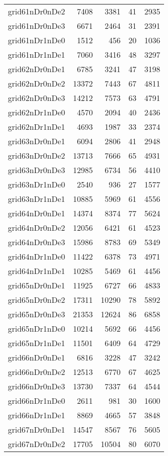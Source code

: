 \documentclass[../../../thesis.tex]{subfiles}
\begin{document}
\begin{longtable}{lrrrr}
grid61nDr0nDe2 & 7408 & 3381 & 41 & 2935 \\
grid61nDr0nDe3 & 6671 & 2464 & 31 & 2391 \\
grid61nDr1nDe0 & 1512 & 456 & 20 & 1036 \\
grid61nDr1nDe1 & 7060 & 3416 & 48 & 3297 \\
grid62nDr0nDe1 & 6785 & 3241 & 47 & 3198 \\
grid62nDr0nDe2 & 13372 & 7443 & 67 & 4811 \\
grid62nDr0nDe3 & 14212 & 7573 & 63 & 4791 \\
grid62nDr1nDe0 & 4570 & 2094 & 40 & 2436 \\
grid62nDr1nDe1 & 4693 & 1987 & 33 & 2374 \\
grid63nDr0nDe1 & 6094 & 2806 & 41 & 2948 \\
grid63nDr0nDe2 & 13713 & 7666 & 65 & 4931 \\
grid63nDr0nDe3 & 12985 & 6734 & 56 & 4410 \\
grid63nDr1nDe0 & 2540 & 936 & 27 & 1577 \\
grid63nDr1nDe1 & 10885 & 5969 & 61 & 4556 \\
grid64nDr0nDe1 & 14374 & 8374 & 77 & 5624 \\
grid64nDr0nDe2 & 12056 & 6421 & 61 & 4523 \\
grid64nDr0nDe3 & 15986 & 8783 & 69 & 5349 \\
grid64nDr1nDe0 & 11422 & 6378 & 73 & 4971 \\
grid64nDr1nDe1 & 10285 & 5469 & 61 & 4456 \\
grid65nDr0nDe1 & 11925 & 6727 & 66 & 4833 \\
grid65nDr0nDe2 & 17311 & 10290 & 78 & 5892 \\
grid65nDr0nDe3 & 21353 & 12624 & 86 & 6858 \\
grid65nDr1nDe0 & 10214 & 5692 & 66 & 4456 \\
grid65nDr1nDe1 & 11501 & 6409 & 64 & 4729 \\
grid66nDr0nDe1 & 6816 & 3228 & 47 & 3242 \\
grid66nDr0nDe2 & 12513 & 6770 & 67 & 4625 \\
grid66nDr0nDe3 & 13730 & 7337 & 64 & 4544 \\
grid66nDr1nDe0 & 2611 & 981 & 30 & 1600 \\
grid66nDr1nDe1 & 8869 & 4665 & 57 & 3848 \\
grid67nDr0nDe1 & 14547 & 8567 & 76 & 5605 \\
grid67nDr0nDe2 & 17705 & 10504 & 80 & 6070 \\

\end{longtable}
\end{document}
